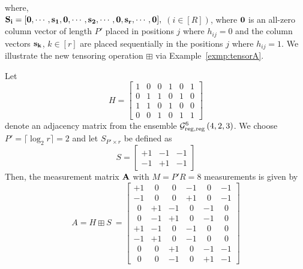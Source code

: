  where, \\
 $\bf S_i= [0, \cdots, s_1 , 0, \cdots, s_2, \cdots, 0, s_r, \cdots, 0],$ $(i\in[R])$, where $\bf 0$ is an all-zero column vector of length $P'$ placed in positions $j$ where $h_{ij}=0$ and the column vectors $\bf s_k$, $k\in[r]$ are placed sequentially in the positions $j$ where $h_{ij}=1$.
We illustrate the new tensoring operation $\boxplus$ via Example~\ref{exmp:tensorA}.

\begin{example}\label{exmp:tensorA}
Let \[H = \begin{bmatrix}
1 & 0 & 0 & 1 & 0 & 1    \\
0 & 1 & 1 & 0 & 1 & 0 \\
1 & 1 & 0 & 1 & 0 & 0 \\
0 & 0 & 1 & 0 & 1 & 1
\end{bmatrix} \] denote an adjacency matrix from the ensemble  $\mathcal{G}^6_{\rm reg,reg}\left(4,2,3 \right)$. We choose $P'= \lceil \log_2 r \rceil = 2$ and let $S_{P' \times r}$ be defined as  
\[ S = \begin{bmatrix}
+1 & -1 & -1\\
-1 & +1 & -1
\end{bmatrix} \]
Then, the measurement matrix $\bf A$ with $M = P'R = 8$ measurements is given by 
\[ A = H \boxplus S \ = \begin{bmatrix}
+1 & \ \ 0 & \ \ 0 & -1 & \ \ 0 & -1\\
-1 & \ \ 0 & \ \ 0 & +1 & \ \ 0 & -1\\
\ \ 0 & +1 & -1 & \ \ 0 & -1 & \ \ 0\\
\ \ 0 & -1 & +1 & \ \ 0 & -1 & \ \ 0\\
+1 & -1 & \ \ 0 & -1 & \ \ 0 &\ \ 0\\
-1 & +1 & \ \ 0 & -1 & \ \ 0 &\ \ 0\\
\ \ 0 & \ \ 0 & +1 & \ \ 0 & -1 & -1\\
\ \ 0 & \ \ 0 & -1 & \ \ 0 & +1 & -1
\end{bmatrix}
 \]

 \end{example}

